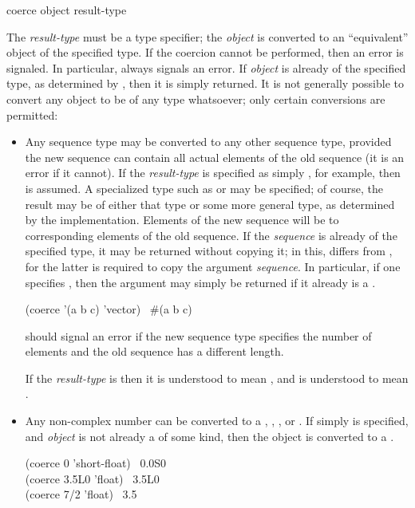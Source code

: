 \begin{defun}[Function]
coerce object result-type

The \emph{result-type} must be a type specifier; the \emph{object} is converted
to an ``equivalent'' object of the specified type.
If the coercion cannot be performed, then an error is signaled.
In particular,  always signals an error.
If \emph{object} is already of the specified type, as determined
by , then it is simply returned.
It is not generally
possible to convert any object to be of any type whatsoever; only certain
conversions are permitted:
\begin{itemize}
\item
Any sequence type may be converted to any other sequence type, provided
the new sequence can contain all actual elements of the old sequence
(it is an error if it cannot).  If the \emph{result-type} is specified as
simply , for example, then  is assumed.  A
specialized type such as  or 
may be specified; of course, the result may be of either that type or
some more general type, as determined by the implementation.
Elements of the new sequence will be  to corresponding elements
of the old sequence.
If the
\emph{sequence} is already of the specified type, it may be returned without
copying it; in this,  differs from
, for the latter is required to
copy the argument \emph{sequence}.  In particular, if one specifies
, then the argument may simply be returned if it already is
a .
\begin{lisp}
(coerce '(a b c) 'vector) \EV\ \#(a b c)
\end{lisp}

 should signal an error if the new sequence type specifies the
number of elements and the old sequence has a different length.

If the \emph{result-type} is 
then it is understood to mean ,
and  is understood to mean .

\item
Any non-complex number can be converted to a ,
, , or .  If simply 
is specified, and \emph{object} is not already a  of some kind, then
the object is converted to a .
\begin{lisp}
(coerce 0 'short-float) \EV\ 0.0S0 \\
(coerce 3.5L0 'float) \EV\ 3.5L0 \\
(coerce 7/2 'float) \EV\ 3.5
\end{lisp}


\end{itemize}
\end{defun}
